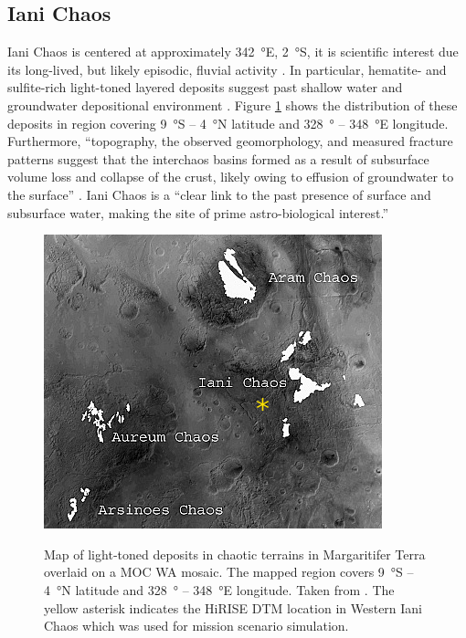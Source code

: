 \subsection{Iani Chaos}
\label{sec:MissionSites:IaniChaos}
Iani Chaos is centered at approximately \SI{342}{\degree}E, \SI{2}{\degree}S, it is scientific interest due its long-lived, but likely episodic, fluvial activity . In particular, hematite- and sulfite-rich light-toned layered deposits suggest past shallow water and groundwater depositional environment . Figure \ref{fig:mission-site-iani-chaos} shows the distribution of these deposits in region covering \SI{9}{\degree}S – \SI{4}{\degree}N latitude and \SI{328}{\degree} – \SI{348}{\degree}E longitude. Furthermore, ``topography, the observed geomorphology, and measured fracture patterns suggest that the interchaos basins formed as a result of subsurface volume loss and collapse of the crust, likely owing to effusion of groundwater to the surface'' . Iani Chaos is a ``clear link to the past presence of surface and subsurface water, making the site of prime astro-biological interest.'' 

\begin{figure}[h]
  \centering
  \hypersetup{linkcolor=captionTextColor}
  \includegraphics[width=0.5\linewidth]{sections/mars-solar-energy/mission-sites/images/iani-chaos-deposits.png}\\
  \caption[Map of light‐toned deposits in chaotic terrains in Margaritifer Terra overlaid on a \ac{MOC} \ac{WA} mosaic]
          {Map of light‐toned deposits in chaotic terrains in Margaritifer Terra overlaid on a \ac{MOC} \ac{WA} mosaic. The mapped region covers \SI{9}{\degree}S – \SI{4}{\degree}N latitude and \SI{328}{\degree} – \SI{348}{\degree}E longitude. Taken from . The yellow asterisk indicates the \ac{HiRISE} \ac{DTM} location in Western Iani Chaos which was used for mission scenario simulation.}
  \label{fig:mission-site-iani-chaos}
\end{figure}

